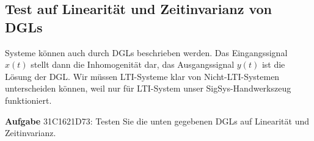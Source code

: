 \documentclass[11pt,a4paper,DIV=12]{scrartcl}
\numberwithin{equation}{section}
\numberwithin{figure}{section}
\begin{document}
\subsection{Test auf Linearität und Zeitinvarianz von DGLs}
\label{sec:31C1621D73}
\begin{Ziel}
Systeme können auch durch DGLs beschrieben werden. Das Eingangssignal $x(t)$
stellt dann die Inhomogenität dar, das Ausgangssignal $y(t)$ ist die Lösung der DGL.
%
Wir müssen LTI-Systeme klar von Nicht-LTI-Systemen unterscheiden können, weil
nur für LTI-System unser SigSys-Handwerkszeug funktioniert.
\end{Ziel}
\textbf{Aufgabe} {\tiny 31C1621D73}: Testen Sie die unten gegebenen DGLs auf
Linearität und Zeitinvarianz.
\end{document}
